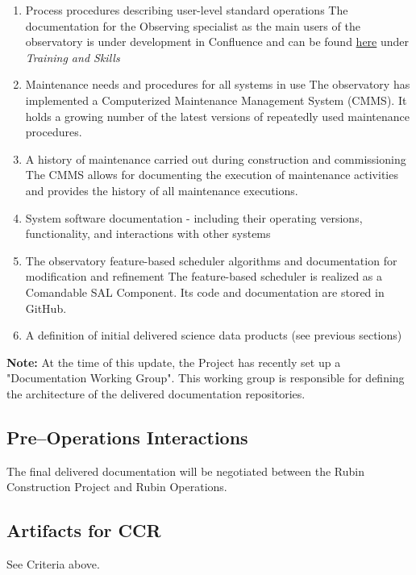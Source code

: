 \begin{enumerate}
	\item Process procedures describing user-level standard operations
	The documentation for the Observing specialist as the main users of the observatory is under development in Confluence and can be found \href{https://rubinobs.atlassian.net/wiki/spaces/OST/overview}{here} under \it{Training and Skills}
	
	\item Maintenance needs and procedures for all systems in use
	The observatory has implemented a Computerized Maintenance Management System (CMMS). 
	It holds a growing number of the latest versions of repeatedly used maintenance procedures.
	
	\item A history of maintenance carried out during construction and commissioning
	The CMMS allows for documenting the execution of maintenance activities and provides the history of all maintenance executions.

	\item System software documentation - including their operating versions, functionality, and interactions with other systems
	
	\item The observatory feature-based scheduler algorithms and documentation for modification and refinement
	The feature-based scheduler is realized as a Comandable SAL Component. Its code and documentation are stored in GitHub.
	
	\item A definition of initial delivered science data products (see previous sections)	
\end{enumerate}

{\bf Note:} At the time of this update, the Project has recently set up a "Documentation Working Group".  This working group is responsible for defining the architecture of the delivered documentation repositories.

\subsection{Pre--Operations Interactions}

The final delivered documentation will be negotiated between the Rubin Construction Project and Rubin Operations.

\subsection{Artifacts for CCR}

See Criteria above.
